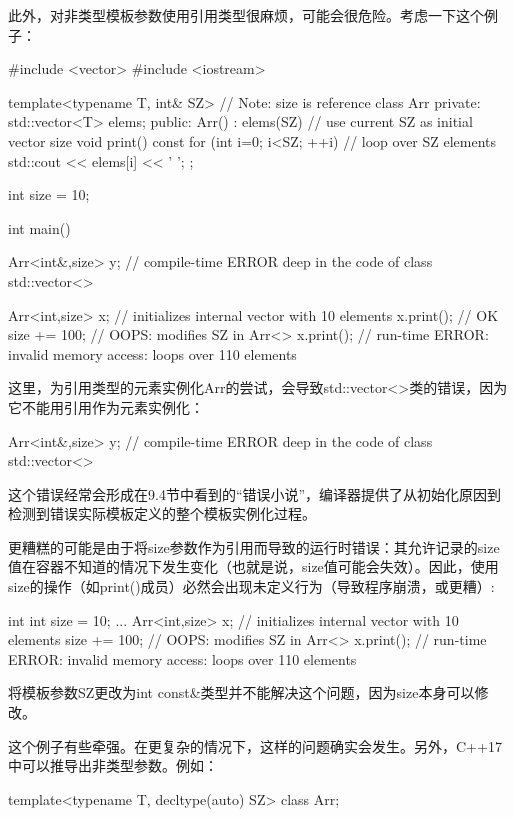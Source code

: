 此外，对非类型模板参数使用引用类型很麻烦，可能会很危险。考虑一下这个例子：

\begin{cpp}
#include <vector>
#include <iostream>

template<typename T, int& SZ> // Note: size is reference
class Arr {
private:
	std::vector<T> elems;
public:
	Arr() : elems(SZ) { // use current SZ as initial vector size
	}
	void print() const {
		for (int i=0; i<SZ; ++i) { // loop over SZ elements
			std::cout << elems[i] << ' ';
		}
	}
};

int size = 10;

int main() {
	Arr<int&,size> y; // compile-time ERROR deep in the code of class std::vector<>

	Arr<int,size> x; // initializes internal vector with 10 elements
	x.print(); // OK
	size += 100; // OOPS: modifies SZ in Arr<>
	x.print(); // run-time ERROR: invalid memory access: loops over 110 elements
}
\end{cpp}

这里，为引用类型的元素实例化Arr的尝试，会导致std::vector<>类的错误，因为它不能用引用作为元素实例化：

\begin{cpp}
Arr<int&,size> y; // compile-time ERROR deep in the code of class std::vector<>
\end{cpp}

这个错误经常会形成在9.4节中看到的“错误小说”，编译器提供了从初始化原因到检测到错误实际模板定义的整个模板实例化过程。

更糟糕的可能是由于将size参数作为引用而导致的运行时错误：其允许记录的size值在容器不知道的情况下发生变化（也就是说，size值可能会失效）。因此，使用size的操作（如print()成员）必然会出现未定义行为（导致程序崩溃，或更糟）:

\begin{cpp}
int int size = 10;
...
Arr<int,size> x; // initializes internal vector with 10 elements
size += 100; // OOPS: modifies SZ in Arr<>
x.print(); // run-time ERROR: invalid memory access: loops over 110 elements
\end{cpp}

将模板参数SZ更改为int const\&类型并不能解决这个问题，因为size本身可以修改。

这个例子有些牵强。在更复杂的情况下，这样的问题确实会发生。另外，C++17中可以推导出非类型参数。例如：

\begin{cpp}
template<typename T, decltype(auto) SZ>
class Arr;
\end{cpp}

